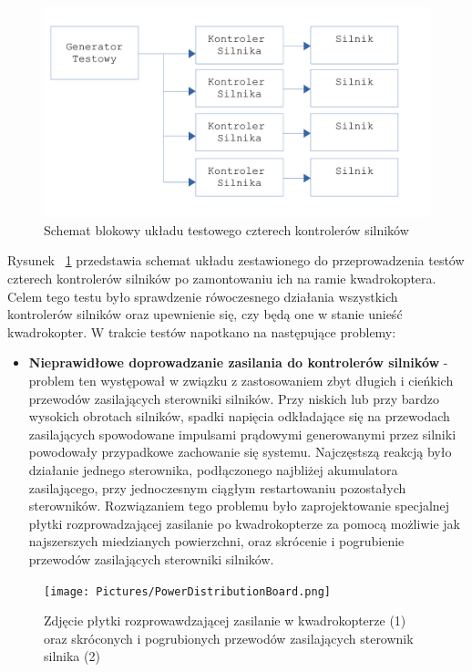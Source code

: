 \begin{figure}[H]
	\centering
	\includegraphics[scale=0.2]{Pictures/TestyKontroleraSilnikow_x4.png}
	\caption[Schemat blokowy układu testowego czterech kontrolerów silników]{Schemat blokowy układu testowego czterech kontrolerów silników}
	\label{fig:MotorController_test_four}
\end{figure}

Rysunek ~\ref{fig:MotorController_test_four} przedstawia schemat układu zestawionego do przeprowadzenia testów czterech kontrolerów silników po zamontowaniu ich na ramie kwadrokoptera. Celem tego testu było sprawdzenie rówoczesnego działania wszystkich kontrolerów silników oraz upewnienie się, czy będą one w stanie unieść kwadrokopter. W trakcie testów napotkano na następujące problemy:
\begin{itemize}
	\item \textbf{Nieprawidłowe doprowadzanie zasilania do kontrolerów silników} - problem ten występował w związku z zastosowaniem zbyt długich i cieńkich przewodów zasilających sterowniki silników. Przy niskich lub przy bardzo wysokich obrotach silników, spadki napięcia odkładające się na przewodach zasilających spowodowane impulsami prądowymi generowanymi przez silniki powodowały przypadkowe zachowanie się systemu. Najczęstszą reakcją było działanie jednego sterownika, podłączonego najbliżej akumulatora zasilającego, przy jednoczesnym ciągłym restartowaniu pozostałych sterowników. Rozwiązaniem tego problemu było zaprojektowanie specjalnej płytki rozprowadzającej zasilanie po kwadrokopterze za pomocą możliwie jak najszerszych miedzianych powierzchni, oraz skrócenie i pogrubienie przewodów zasilających sterowniki silników.
\end{itemize}

\begin{figure}[H]
	\centering
	\texttt{[image: Pictures/PowerDistributionBoard.png]}
	\caption[Zdjęcie płytki rozprowadzającej zasilanie w kwadrokopterze (1) oraz skróconych i pogrubionych przewodów zasilających sterownik silnika (2)]{Zdjęcie płytki rozprowawdzającej zasilanie w kwadrokopterze (1) oraz skróconych i pogrubionych przewodów zasilających sterownik silnika (2)}
	\label{fig:PowerDistribudionBoard}
\end{figure}


